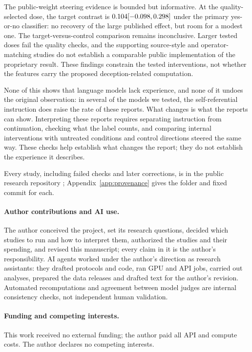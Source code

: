 \documentclass[11pt]{article}
\begin{document}
The public-weight steering evidence is bounded but informative. At the
quality-selected dose, the target contrast is
$0.104{}
[-0.098{},0.298{}]$ under the primary
yes-or-no classifier: no recovery of the large published effect, but room
for a modest one. The target-versus-control comparison remains inconclusive.
Larger tested doses fail the quality checks, and the supporting
source-style and operator-matching studies do not establish a comparable
public implementation of the proprietary result. These findings constrain
the tested interventions, not whether the features carry the proposed
deception-related computation.

None of this shows that language models lack experience, and none of it
undoes the original observation: in several of the models we tested, the
self-referential instruction does raise the rate of these reports. What
changes is what the reports can show. Interpreting these reports requires
separating instruction from continuation, checking what the label counts,
and comparing internal interventions with untreated conditions and control
directions steered the same way. These checks help establish what changes
the report; they do not establish the experience it describes.

Every study, including failed checks and later corrections, is in the public
research repository \citep{jones2026evidence}; Appendix~\ref{app:provenance}
gives the folder and fixed commit for each.

\paragraph{Author contributions and AI use.}
The author conceived the project, set its research questions, decided which
studies to run and how to interpret them, authorized the studies and their
spending, and revised this manuscript; every claim in it is the
author's responsibility. AI agents worked under the author's direction as research
assistants: they drafted protocols and code, ran GPU and API jobs, carried
out analyses, prepared the data releases and drafted text for the author's
revision. Automated recomputations and agreement between model judges are
internal consistency checks, not independent human validation.

\paragraph{Funding and competing interests.}
This work received no external funding; the author paid all API and compute
costs. The author declares no competing interests.
\end{document}
